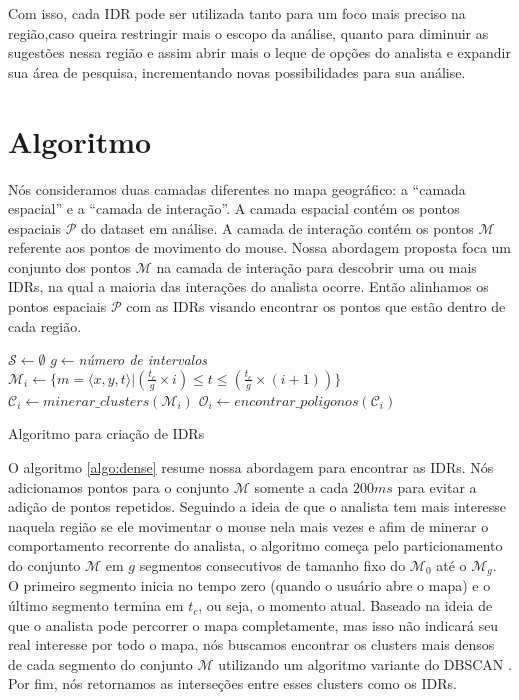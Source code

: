 Com isso, cada IDR pode ser utilizada tanto para um foco mais preciso na região,caso queira restringir mais o escopo da análise, quanto para diminuir as sugestões nessa região e assim abrir mais o leque de opções do analista e expandir sua área de pesquisa, incrementando novas possibilidades para sua análise.

\section{Algoritmo}

Nós consideramos duas camadas diferentes no mapa geográfico: a ``camada espacial'' e a ``camada de interação''. A camada espacial contém os pontos espaciais $\mathcal{P}$ do dataset em análise. A camada de interação  contém os pontos $\mathcal{M}$ referente aos pontos de movimento do mouse. Nossa abordagem proposta foca um conjunto dos pontos $\mathcal{M}$ na camada de interação para descobrir uma ou mais IDRs, na qual a maioria das interações do analista ocorre. Então alinhamos os pontos espaciais $\mathcal{P}$ com as IDRs visando encontrar os pontos que estão dentro de cada região. 

\begin{algorithm}[t]
    \DontPrintSemicolon
    $\mathcal{S} \gets \emptyset$\;
    $g \gets ${\em número de intervalos}\;
    {
           $\mathcal{M}_i \gets \{m = \langle x,y,t \rangle | (\frac{t_c}{g} \times i) \leq t \leq (\frac{t_c}{g} \times (i+1))\}$\;
           $\mathcal{C}_i \gets \mathit{minerar\_clusters}(\mathcal{M}_i)$\label{ln:mine}\;
           $\mathcal{O}_i \gets \mathit{encontrar\_poligonos}(\mathcal{C}_i)$\label{ln:poly}\;
    }
	\; 
\caption{Algoritmo para criação de IDRs}
\label{algo:dense}
\end{algorithm}

O algoritmo \ref{algo:dense} resume nossa abordagem para encontrar as IDRs. Nós adicionamos pontos para o conjunto $\mathcal{M}$ somente a cada $200ms$ para evitar a adição de pontos repetidos. Seguindo a ideia de que o analista tem mais interesse naquela região se ele movimentar o mouse nela mais vezes e afim de minerar o comportamento recorrente do analista, o algoritmo começa pelo particionamento do conjunto $\mathcal{M}$ em $g$ segmentos consecutivos de tamanho fixo do $\mathcal{M}_0$ até o $\mathcal{M}_g$. O primeiro segmento inicia no tempo zero (quando o usuário abre o mapa) e o último segmento termina em $t_c$, ou seja, o momento atual. Baseado na ideia de que o analista pode percorrer o mapa completamente, mas isso não indicará seu real interesse por todo o mapa, nós buscamos encontrar os clusters mais densos de cada segmento do conjunto $\mathcal{M}$ utilizando um algoritmo variante do DBSCAN \cite{Ester:1996:DAD:3001460.3001507}. Por fim, nós retornamos as interseções entre esses clusters como os IDRs.

